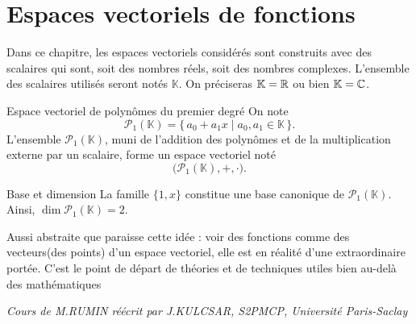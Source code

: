 \chapter{Espaces vectoriels de fonctions}\label{chap:evf}

Dans ce chapitre, les espaces vectoriels considérés sont construits
avec des scalaires qui sont, soit des nombres réels, soit des nombres complexes.
L’ensemble des scalaires utilisés seront notés \(\mathbb{K}\). On préciseras
\(\mathbb{K} = \mathbb{R}\) ou bien \(\mathbb{K} = \mathbb{C}\).

\begin{definition}{Espace vectoriel de polynômes du premier degré}{}
  On note
  \[
    \mathcal{P}_1(\mathbb{K}) = \{\, a_0 + a_1x \mid a_0, a_1 \in
    \mathbb{K}\,\}.
  \]
  L’ensemble $\mathcal{P}_1(\mathbb{K})$, muni de l’addition des
  polynômes et de la multiplication externe par un scalaire,
  forme un espace vectoriel noté
  \[
    \bigl(\mathcal{P}_1(\mathbb{K}), +, \cdot \bigr).
  \]

\begin{example}{Base et dimension}
  La famille $\{1, x\}$ constitue une base canonique de
  $\mathcal{P}_1(\mathbb{K})$.
  Ainsi, $\dim \mathcal{P}_1(\mathbb{K}) = 2$.
\end{example}
\end{definition}

\begin{Note}
  Aussi abstraite que paraisse cette idée : voir des fonctions comme
  des vecteurs(des points) d’un espace vectoriel, elle est en réalité d’une
  extraordinaire portée. C’est le point de départ de théories et de techniques
  utiles bien au-delà des mathématiques\par
  \emph{Cours de M.RUMIN réécrit par J.KULCSAR, S2PMCP, Université Paris-Saclay}
\end{Note}
